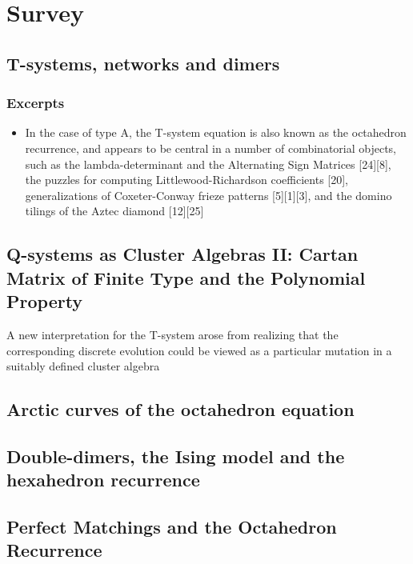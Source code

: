 \chapter{Survey}


\section{T-systems, networks and dimers \cite{di2014tystemsnetworksdimers}	}
\subsection{Excerpts}
\begin{itemize}
	\item  In the case of type A, the T-system equation is also known as the octahedron recurrence, and appears to be central in a number of combinatorial objects, such as the lambda-determinant and the Alternating Sign Matrices [24][8], the puzzles for computing Littlewood-Richardson coefficients [20], generalizations of Coxeter-Conway frieze patterns [5][1][3], and the domino tilings of the Aztec diamond [12][25]
\end{itemize}

\section{Q-systems as Cluster Algebras {II}: Cartan Matrix of Finite Type and the Polynomial Property \cite{Di_Francesco_2009}}
A new interpretation for the T-system arose from realizing that the corresponding discrete evolution could be viewed as a particular mutation in a suitably defined cluster algebra

\section{Arctic curves of the octahedron equation \cite{di2014arctic}}


\section{Double-dimers, the Ising model and the hexahedron recurrence \cite{kenyon2013double}}

\section{Perfect Matchings and the Octahedron Recurrence \cite{speyer2004perfect}}